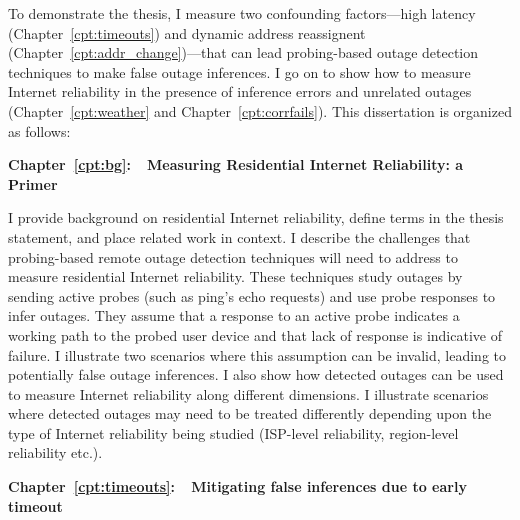 To demonstrate the thesis, I measure two confounding factors---high
latency (Chapter~\ref{cpt:timeouts}) and dynamic address reassignent
(Chapter~\ref{cpt:addr_change})---that can lead probing-based outage
detection techniques to make false outage inferences. I go on to show how
to measure Internet reliability in the presence of inference errors
and unrelated outages (Chapter~\ref{cpt:weather} and
Chapter~\ref{cpt:corrfails}). This dissertation is organized as follows:



\textbf{Chapter~\ref{cpt:bg}:~~Measuring Residential Internet
  Reliability: a Primer}

I provide background on residential
Internet reliability, define terms in the thesis statement, and place
related work in context. I describe the challenges that probing-based
remote outage detection techniques will need to address to measure
residential Internet reliability. These techniques study outages by
sending active probes (such as ping's echo requests) and use probe
responses to infer outages. They assume that a response to an active
probe indicates a working path to the probed user device and that lack
of response is indicative of failure. I illustrate two scenarios where
this assumption can be invalid, leading to potentially false outage
inferences. I also show how detected outages can be used to measure
Internet reliability along different dimensions. I illustrate
scenarios where detected outages may
need to be treated differently depending upon the type of
Internet reliability being studied (ISP-level reliability,
region-level reliability etc.).

\textbf{Chapter~\ref{cpt:timeouts}:~~Mitigating false inferences due
to early timeout} 

